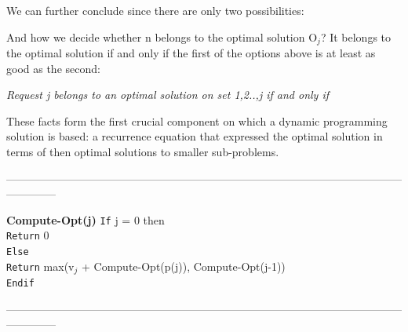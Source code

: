 \documentclass{article}
\begin{document}
\begin{center}
\end{center}

\begin{center}
\end{center}

We can further conclude since there are only two possibilities:

\begin{center}
\end{center}

And how we decide whether n belongs to the optimal solution O$_j$? It belongs to the optimal solution if and only if the first of the options above is at least as good as the second:

\begin{center}
    \emph{Request j belongs to an optimal solution on set {1,2..,j} if and only if}\\
\end{center}

These facts form the first crucial component on which a dynamic programming solution is based: a recurrence equation that expressed the optimal solution in terms of then optimal solutions to smaller sub-problems.\\

\medskip

--------------------------------------------------------------------------------------------------------------------------
\medskip

\textbf{Compute-Opt(j)}
\texttt{If} j = 0 then\\
\texttt{Return} 0\\
\texttt{Else}\\
\texttt{Return} max(v$_j$ + Compute-Opt(p(j)), Compute-Opt(j-1))\\
\texttt{Endif}\\

\medskip

--------------------------------------------------------------------------------------------------------------------------
\medskip

\begin{center}
\end{center}
\end{document}
